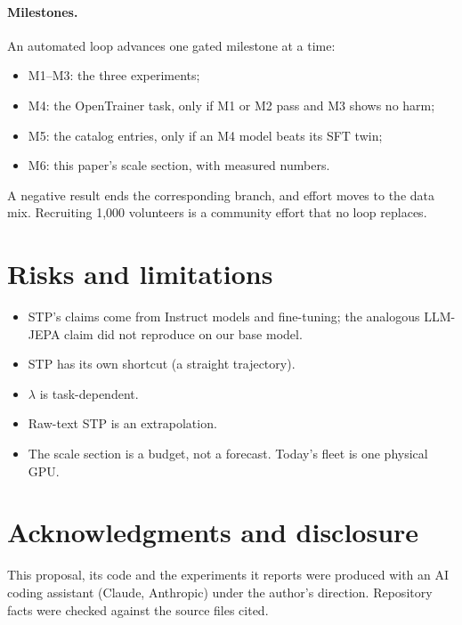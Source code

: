 \documentclass[11pt]{article}
\begin{document}
\paragraph{Milestones.} An automated loop advances one gated milestone at a time:
\begin{itemize}
\item M1--M3: the three experiments;
\item M4: the OpenTrainer task, only if M1 or M2 pass and M3 shows no harm;
\item M5: the catalog entries, only if an M4 model beats its SFT twin;
\item M6: this paper's scale section, with measured numbers.
\end{itemize}
A negative result ends the corresponding branch, and effort moves to the data mix. Recruiting 1{,}000 volunteers is a
community effort that no loop replaces.

\section{Risks and limitations}
\begin{itemize}
\item STP's claims come from Instruct models and fine-tuning; the analogous LLM-JEPA claim did not reproduce on our
base model.
\item STP has its own shortcut (a straight trajectory).
\item $\lambda$ is task-dependent.
\item Raw-text STP is an extrapolation.
\item The scale section is a budget, not a forecast. Today's fleet is one physical GPU.
\end{itemize}

\section*{Acknowledgments and disclosure}
This proposal, its code and the experiments it reports were produced with an AI coding assistant (Claude, Anthropic)
under the author's direction. Repository facts were checked against the source files cited.
\end{document}

